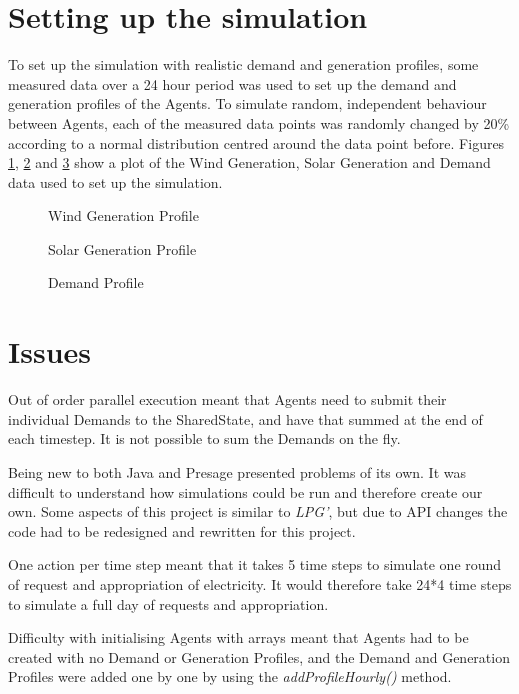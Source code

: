 \section*{Setting up the simulation}
To set up the simulation with realistic demand and generation profiles, some measured data over a 24 hour period was used to set up the demand and generation profiles of the Agents. To simulate random, independent behaviour between Agents, each of the measured data points was randomly changed by 20\% according to a normal distribution centred around the data point before. Figures \ref{fig:WindGenProfile}, \ref{fig:SolarGenProfile} and \ref{fig:DemandProfile} show a plot of the Wind Generation, Solar Generation and Demand data used to set up the simulation.

\begin{figure} 
	\centering \newlength\figureheight \newlength\figurewidth 
	\setlength\figureheight{6cm} 
	\setlength\figurewidth{13cm} 
	 
	\caption{Wind Generation Profile} 
	\label{fig:WindGenProfile} 
\end{figure}

\begin{figure} 
	\centering
	\setlength\figureheight{6cm} 
	\setlength\figurewidth{13cm} 
	 
	\caption{Solar Generation Profile} 
	\label{fig:SolarGenProfile} 
\end{figure}

\begin{figure} 
	\centering
	\setlength\figureheight{6cm} 
	\setlength\figurewidth{13cm} 
	 
	\caption{Demand Profile} 
	\label{fig:DemandProfile} 
\end{figure}

\section*{Issues}
Out of order parallel execution meant that Agents need to submit their individual Demands to the SharedState, and have that summed at the end of each timestep. It is not possible to sum the Demands on the fly.

Being new to both Java and Presage presented problems of its own. It was difficult to understand how simulations could be run and therefore create our own. Some aspects of this project is similar to \textit{LPG'}, but due to API changes the code had to be redesigned and rewritten for this project.

One action per time step meant that it takes 5 time steps to simulate one round of request and appropriation of electricity. It would therefore take 24*4 time steps to simulate a full day of requests and appropriation.

Difficulty with initialising Agents with arrays meant that Agents had to be created with no Demand or Generation Profiles, and the Demand and Generation Profiles were added one by one by using the \textit{addProfileHourly()} method.
